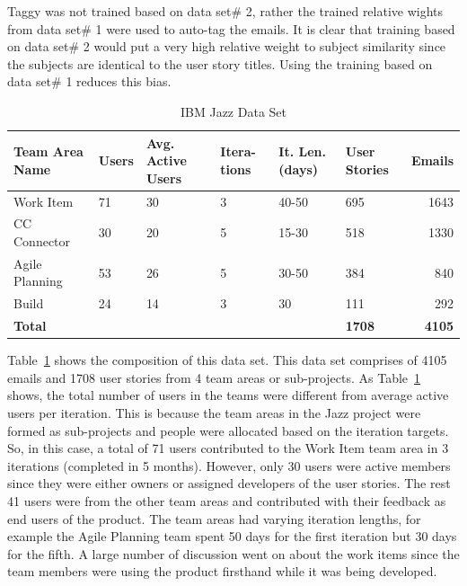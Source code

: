 Taggy was not trained based on data set\# 2, rather the trained relative wights from data set\# 1 were used to auto-tag the emails. It is clear that training based on data set\# 2 would put a very high relative weight to subject similarity since the subjects are identical to the user story titles. Using the training based on data set\# 1 reduces this bias.


\begin{table}[h!]
  \centering
  \caption{IBM Jazz Data Set}
	\label{tab:jazz}
    \begin{tabular}{|p{3cm}|p{1.5cm}|p{1.5cm}|p{1.3cm}|p{2cm}|p{2cm}|r|}
      \hline
      \textbf{Team Area Name} & \textbf{Users} & \textbf{Avg. Active Users} & \textbf{Itera- tions} & \textbf{It. Len. (days)}  & \textbf{User Stories} & \textbf{Emails}\\
      \hline                
      Work Item 			& 71 & 30		& 3 	& 40-50  		& 695 		& 1643 \\
      \hline
      CC Connector 	  & 30 & 20		& 5 	& 15-30 		& 518 	& 1330 \\
      \hline
      Agile Planning 	& 53 & 26 	& 5 	& 30-50 		& 384		& 840 \\
      \hline
      Build 					& 24 & 14		& 3 	& 30 				& 111 	& 292 \\
      \hline
      \textbf{Total} &  &  & &  & \textbf{1708} & \textbf{4105}\\
      \hline
    \end{tabular}
\end{table}

Table~\ref{tab:jazz} shows the composition of this data set. This data set comprises of 4105 emails and 1708 user stories from 4 team areas or sub-projects. As Table~\ref{tab:jazz} shows, the total number of users in the teams were different from average active users per iteration. This is because the team areas in the Jazz project were formed as sub-projects and people were allocated based on the iteration targets. So, in this case, a total of 71 users contributed to the Work Item team area in 3 iterations (completed in 5 months). However, only 30 users were active members since they were either owners or assigned developers of the user stories. The rest 41 users were from the other team areas and contributed with their feedback as end users of the product. The team areas had varying iteration lengths, for example the Agile Planning team spent 50 days for the first iteration but 30 days for the fifth. A large number of discussion went on about the work items since the team members were using the product firsthand while it was being developed.

